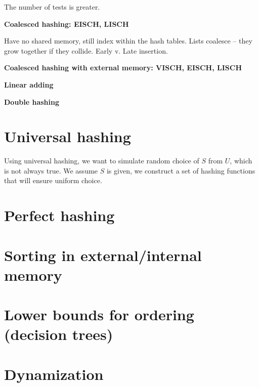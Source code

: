 \begin{multicols}{3}
The number of tests is greater.

{\bf Coalesced hashing: EISCH, LISCH}

Have no shared memory, still index within the hash tables. Lists coalesce -- they grow together if they collide.
Early v. Late insertion.

{\bf Coalesced hashing with external memory: VISCH, EISCH, LISCH}

{\bf Linear adding}

{\bf Double hashing}

\section{Universal hashing}

Using universal hashing, we want to simulate random choice of $S$ from $U$, which is not always true.
We assume $S$ is given, we construct a set of hashing functions that will ensure uniform choice.






\section{Perfect hashing}

\section{Sorting in external/internal memory}

\section{Lower bounds for ordering (decision trees)}


\section{Dynamization}


\end{multicols}
